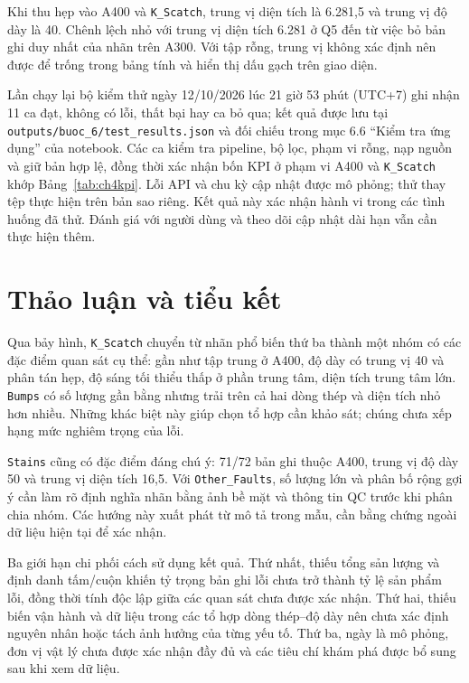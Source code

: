 \documentclass[12pt,a4paper,oneside]{report}
\newcommand{\maCot}[1]{{\urlstyle{tt}\def\UrlBreaks{\do\_\do\/\do\.}\def\UrlBigBreaks{}\nolinkurl{#1}}}
\begin{document}
Khi thu hẹp vào A400 và \maCot{K_Scatch}, trung vị diện tích là 6.281,5 và trung vị độ dày là 40. Chênh lệch nhỏ với trung vị diện tích 6.281 ở Q5 đến từ việc bỏ bản ghi duy nhất của nhãn trên A300. Với tập rỗng, trung vị không xác định nên được để trống trong bảng tính và hiển thị dấu gạch trên giao diện.

Lần chạy lại bộ kiểm thử ngày 12/10/2026 lúc 21 giờ 53 phút (UTC+7) ghi nhận 11 ca đạt, không có lỗi, thất bại hay ca bỏ qua; kết quả được lưu tại \maCot{outputs/buoc_6/test_results.json} và đối chiếu trong mục 6.6 ``Kiểm tra ứng dụng'' của notebook. Các ca kiểm tra pipeline, bộ lọc, phạm vi rỗng, nạp nguồn và giữ bản hợp lệ, đồng thời xác nhận bốn KPI ở phạm vi A400 và \maCot{K_Scatch} khớp Bảng~\ref{tab:ch4kpi}. Lỗi API và chu kỳ cập nhật được mô phỏng; thử thay tệp thực hiện trên bản sao riêng. Kết quả này xác nhận hành vi trong các tình huống đã thử. Đánh giá với người dùng và theo dõi cập nhật dài hạn vẫn cần thực hiện thêm.

\section{Thảo luận và tiểu kết}
\label{sec:ch4thaoluan}

Qua bảy hình, \maCot{K_Scatch} chuyển từ nhãn phổ biến thứ ba thành một nhóm có các đặc điểm quan sát cụ thể: gần như tập trung ở A400, độ dày có trung vị 40 và phân tán hẹp, độ sáng tối thiểu thấp ở phần trung tâm, diện tích trung tâm lớn. \maCot{Bumps} có số lượng gần bằng nhưng trải trên cả hai dòng thép và diện tích nhỏ hơn nhiều. Những khác biệt này giúp chọn tổ hợp cần khảo sát; chúng chưa xếp hạng mức nghiêm trọng của lỗi.

\maCot{Stains} cũng có đặc điểm đáng chú ý: 71/72 bản ghi thuộc A400, trung vị độ dày 50 và trung vị diện tích 16,5. Với \maCot{Other_Faults}, số lượng lớn và phân bố rộng gợi ý cần làm rõ định nghĩa nhãn bằng ảnh bề mặt và thông tin QC trước khi phân chia nhóm. Các hướng này xuất phát từ mô tả trong mẫu, cần bằng chứng ngoài dữ liệu hiện tại để xác nhận.

Ba giới hạn chi phối cách sử dụng kết quả. Thứ nhất, thiếu tổng sản lượng và định danh tấm/cuộn khiến tỷ trọng bản ghi lỗi chưa trở thành tỷ lệ sản phẩm lỗi, đồng thời tính độc lập giữa các quan sát chưa được xác nhận. Thứ hai, thiếu biến vận hành và dữ liệu trong các tổ hợp dòng thép--độ dày nên chưa xác định nguyên nhân hoặc tách ảnh hưởng của từng yếu tố. Thứ ba, ngày là mô phỏng, đơn vị vật lý chưa được xác nhận đầy đủ và các tiêu chí khám phá được bổ sung sau khi xem dữ liệu.
\end{document}
